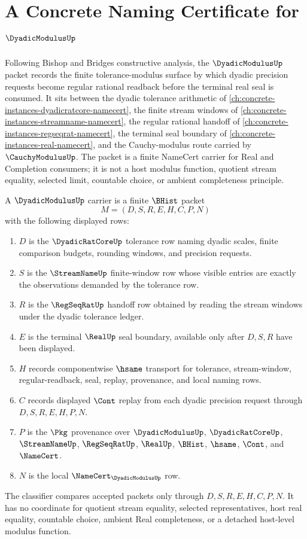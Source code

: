 \chapter{A Concrete Naming Certificate for $\DyadicModulusUp$}
\label{ch:concrete-instances-dyadic-modulus-namecert}

Following Bishop and Bridges constructive analysis, the $\DyadicModulusUp$ packet records the finite tolerance-modulus surface by which dyadic precision requests become regular rational readback before the terminal real seal is consumed. It sits between the dyadic tolerance arithmetic of \autoref{ch:concrete-instances-dyadicratcore-namecert}, the finite stream windows of \autoref{ch:concrete-instances-streamname-namecert}, the regular rational handoff of \autoref{ch:concrete-instances-regseqrat-namecert}, the terminal seal boundary of \autoref{ch:concrete-instances-real-namecert}, and the Cauchy-modulus route carried by $\CauchyModulusUp$. The packet is a finite NameCert carrier for Real and Completion consumers; it is not a host modulus function, quotient stream equality, selected limit, countable choice, or ambient completeness principle.

\begin{definition}
\label{def:dyadic-modulus-carrier}
A $\DyadicModulusUp$ carrier is a finite $\BHist$ packet
$$
M=(D,S,R,E,H,C,P,N)
$$
with the following displayed rows:
\begin{enumerate}
\item $D$ is the $\DyadicRatCoreUp$ tolerance row naming dyadic scales, finite comparison budgets, rounding windows, and precision requests.
\item $S$ is the $\StreamNameUp$ finite-window row whose visible entries are exactly the observations demanded by the tolerance row.
\item $R$ is the $\RegSeqRatUp$ handoff row obtained by reading the stream windows under the dyadic tolerance ledger.
\item $E$ is the terminal $\RealUp$ seal boundary, available only after $D,S,R$ have been displayed.
\item $H$ records componentwise $\hsame$ transport for tolerance, stream-window, regular-readback, seal, replay, provenance, and local naming rows.
\item $C$ records displayed $\Cont$ replay from each dyadic precision request through $D,S,R,E,H,P,N$.
\item $P$ is the $\Pkg$ provenance over $\DyadicModulusUp$, $\DyadicRatCoreUp$, $\StreamNameUp$, $\RegSeqRatUp$, $\RealUp$, $\BHist$, $\hsame$, $\Cont$, and $\NameCert$.
\item $N$ is the local $\NameCert_{\DyadicModulusUp}$ row.
\end{enumerate}
The classifier compares accepted packets only through $D,S,R,E,H,C,P,N$. It has no coordinate for quotient stream equality, selected representatives, host real equality, countable choice, ambient Real completeness, or a detached host-level modulus function.
\end{definition}

